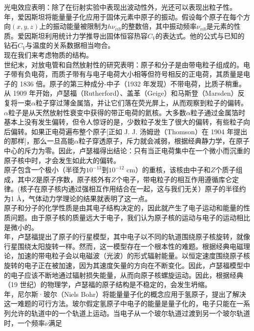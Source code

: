 	\indent 光电效应表明：除了在衍射实验中表现出波动性外，光还可以表现出粒子性。\\
	 年，爱因斯坦将能量量子化应用于固体元素中原子的振动。假设每个原子在每个方向$\left(x,y,z\right)$上的振动能量被限制为$h\nu_{vib}$的整数倍，其中振动频率$\nu_{vib}$是元素的性质。爱因斯坦利用统计力学推导出固体恒容热容$C_V$的表达式。他的公式与已知的钻石$C_V$与温度的关系数据相当吻合。\\
	\indent 现在我们来考虑物质的结构。\\
	 世纪末，对放电管和自然放射性的研究表明：原子和分子是由带电粒子组成的。电子带有负电荷，而质子带有与电子电荷大小相等但符号相反的正电荷，其质量是电子的 1836 倍。原子的第三种成分-中子（1932 年发现）不带电荷，比质子稍重。\\
	\indent 从 1909 年开始，卢瑟福（Rutherford）、盖革（Geige）和马斯登（Marsden）反复将一束$\alpha$粒子穿过薄金属箔，并让它们落在荧光屏上，从而观察到粒子的偏转。$\alpha$粒子是从天然放射性衰变中获得的带正电荷的氦核。大多数$\alpha$粒子通过金属箔时基本上没有发生偏转，但令人惊讶的是，少数粒子发生了很大的偏转，有些粒子向后偏转。如果正电荷遍布整个原子[正如 J. J. 汤姆逊（Thomson）在 1904 年提出的那样]，那么一旦高能$\alpha$粒子穿透原子，斥力就会减弱，根据经典静力学，在原子中心的斥力为零。因此，卢瑟福得出结论：只有当正电荷集中在一个微小而沉重的原子核中时，才会发生如此大的偏转。\\
	\indent 原子包含一个极小（半径为$10^{-13}$到$10^{-12}$ cm）的重核，该核由中子和$Z$个质子组成，其中$Z$是原子序数，原子核外有$Z$个电子，带电粒子的相互作用遵循库仑定律。(核子在原子核内通过强相互作用结合在一起，这与我们无关）原子的半径约为1 \AA，气体动力学理论的结果就表明了这一点。\\
	\indent 原子和分子的化学性质是由其电子结构决定的，因此就产生了电子运动和能量的性质问题。由于原子核的质量远大于电子，我们认为原子核的运动与电子的运动相比是微小的。\\
	 年，卢瑟福提出了原子的行星模型，其中电子以不同的轨道围绕原子核旋转，就像行星围绕太阳旋转一样。然而，这一模型存在一个根本性的难题。根据经典电磁理论，加速的带电粒子会以电磁波（光波）的形式辐射能量。以恒定速度围绕原子核旋转的电子正在被加速，因为其速度矢量的方向在不断变化。因此，卢瑟福模型中的电子应该不断地通过辐射损失能量，从而向原子核螺旋运动。因此，根据经典（19 世纪）的物理学，卢瑟福的原子结构是不稳定的，会发生坍缩。\\
	 年，尼尔斯·玻尔（Niels Bohr）将能量量子化的概念应用于氢原子，提出了解决这一难题的可行方法。玻尔假定氢原子中电子的能量是量子化的，电子只能在一系列允许的轨道中的一个轨道上运动。当电子从一个玻尔轨道过渡到另一个玻尔轨道时，一个频率$\nu$满足
